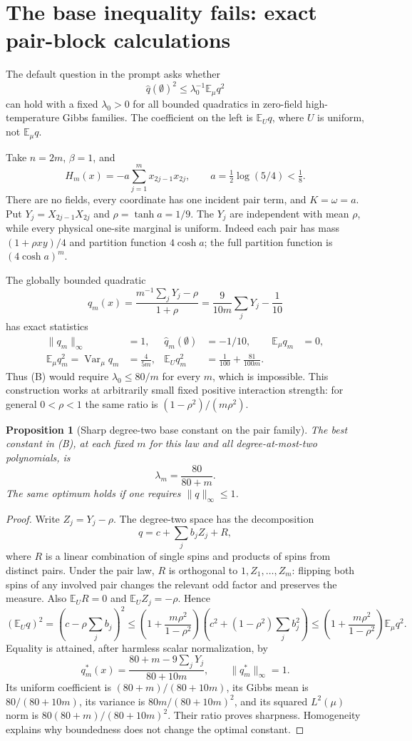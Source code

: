\documentclass[11pt]{article}
\newtheorem{proposition}[theorem]{Proposition}
\newcommand{\E}{\mathbb E}
\newcommand{\Var}{\operatorname{Var}}
\begin{document}
\section{The base inequality fails: exact pair-block calculations}

The default question in the prompt asks whether
\[
 \widehat q(\emptyset)^2\le\lambda_0^{-1}\E_\mu q^2
 \tag{B}
\]
can hold with a fixed $\lambda_0>0$ for all bounded quadratics in
zero-field high-temperature Gibbs families. The coefficient on the
left is $\E_U q$, where $U$ is uniform, not $\E_\mu q$.

Take $n=2m$, $\beta=1$, and
\[
 H_m(x)=-a\sum_{j=1}^m x_{2j-1}x_{2j},\qquad
 a=\tfrac12\log(5/4)<\tfrac18.
\]
There are no fields, every coordinate has one incident pair term,
and $K=\omega=a$. Put $Y_j=X_{2j-1}X_{2j}$ and
$\rho=\tanh a=1/9$. The $Y_j$ are independent with mean $\rho$,
while every physical one-site marginal is uniform. Indeed each pair
has mass $(1+\rho xy)/4$ and partition function $4\cosh a$;
the full partition function is $(4\cosh a)^m$.

The globally bounded quadratic
\[
 q_m(x)=\frac{m^{-1}\sum_jY_j-\rho}{1+\rho}
       =\frac9{10m}\sum_jY_j-\frac1{10}
\]
has exact statistics
\begin{align}
 \|q_m\|_\infty&=1,&\widehat q_m(\emptyset)&=-1/10,
       &\E_\mu q_m&=0,\nonumber\\
 \E_\mu q_m^2=\Var_\mu q_m&=\frac4{5m},&
 \E_Uq_m^2&=\frac1{100}+\frac{81}{100m}.\label{eq:pair-stats}
\end{align}
Thus (B) would require $\lambda_0\le80/m$ for every $m$,
which is impossible. This construction works at arbitrarily small
fixed positive interaction strength: for general $0<\rho<1$ the
same ratio is $(1-\rho^2)/(m\rho^2)$.

\begin{proposition}[Sharp degree-two base constant on the pair family]
The best constant in (B), at each fixed $m$ for this law and all
degree-at-most-two polynomials, is
\[
 \lambda_m=\frac{80}{80+m}.
\]
The same optimum holds if one requires $\|q\|_\infty\le1$.
\end{proposition}
\begin{proof}
Write $Z_j=Y_j-\rho$. The degree-two space has the decomposition
\[
 q=c+\sum_j b_jZ_j+R,
\]
where $R$ is a linear combination of single spins and products of
spins from distinct pairs. Under the pair law, $R$ is orthogonal
to $1,Z_1,\ldots,Z_m$: flipping both spins of any involved pair
changes the relevant odd factor and preserves the measure.
Also $\E_U R=0$ and $\E_U Z_j=-\rho$. Hence
\[
 (\E_U q)^2=(c-\rho\sum_jb_j)^2
 \le\left(1+\frac{m\rho^2}{1-\rho^2}\right)
       \left(c^2+(1-\rho^2)\sum_jb_j^2\right)
 \le\left(1+\frac{m\rho^2}{1-\rho^2}\right)\E_\mu q^2.
\]
Equality is attained, after harmless scalar normalization, by
\[
 q_m^*(x)=\frac{80+m-9\sum_jY_j}{80+10m},\qquad
 \|q_m^*\|_\infty=1.
\]
Its uniform coefficient is $(80+m)/(80+10m)$, its Gibbs mean is
$80/(80+10m)$, its variance is $80m/(80+10m)^2$, and its squared
$L^2(\mu)$ norm is $80(80+m)/(80+10m)^2$. Their ratio proves
sharpness. Homogeneity explains why boundedness does not change
the optimal constant.
\end{proof}
\end{document}
